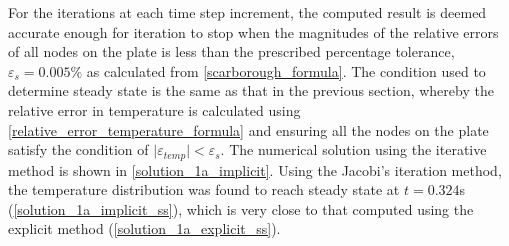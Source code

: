 \documentclass[a4paper]{article}
\begin{document}
		For the iterations at each time step increment, the computed result is deemed accurate enough for iteration to stop when the magnitudes of the relative errors of all nodes on the plate is less than the prescribed percentage tolerance, $\varepsilon_s = 0.005\%$ as calculated from \autoref{scarborough_formula}. The condition used to determine steady state is the same as that in the previous section, whereby the relative error in temperature is calculated using \autoref{relative_error_temperature_formula} and ensuring all the nodes on the plate satisfy the condition of $\vert\varepsilon_{temp}\vert < \varepsilon_s$. The numerical solution using the iterative method is shown in \autoref{solution_1a_implicit}. Using the Jacobi's iteration method, the temperature distribution was found to reach steady state at $t=0.324$s (\autoref{solution_1a_implicit_ss}), which is very close to that computed using the explicit method (\autoref{solution_1a_explicit_ss}).
		
\end{document}
